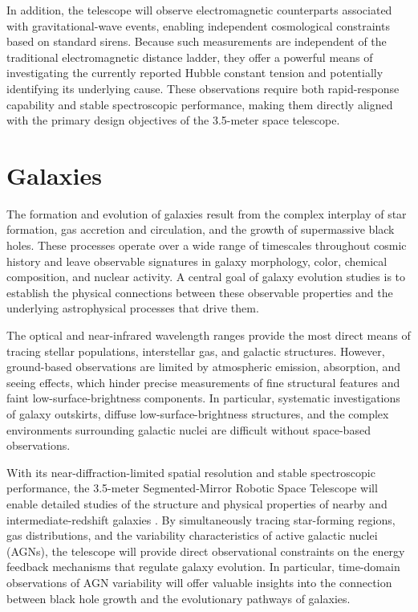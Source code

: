 In addition, the telescope will observe electromagnetic counterparts associated with gravitational-wave events, enabling independent cosmological constraints based on standard sirens. Because such measurements are independent of the traditional electromagnetic distance ladder, they offer a powerful means of investigating the currently reported Hubble constant tension and potentially identifying its underlying cause. These observations require both rapid-response capability and stable spectroscopic performance, making them directly aligned with the primary design objectives of the 3.5-meter space telescope.

\section{Galaxies}

The formation and evolution of galaxies result from the complex interplay of star formation, gas accretion and circulation, and the growth of supermassive black holes. These processes operate over a wide range of timescales throughout cosmic history and leave observable signatures in galaxy morphology, color, chemical composition, and nuclear activity. A central goal of galaxy evolution studies is to establish the physical connections between these observable properties and the underlying astrophysical processes that drive them.

The optical and near-infrared wavelength ranges provide the most direct means of tracing stellar populations, interstellar gas, and galactic structures. However, ground-based observations are limited by atmospheric emission, absorption, and seeing effects, which hinder precise measurements of fine structural features and faint low-surface-brightness components. In particular, systematic investigations of galaxy outskirts, diffuse low-surface-brightness structures, and the complex environments surrounding galactic nuclei are difficult without space-based observations.

With its near-diffraction-limited spatial resolution and stable spectroscopic performance, the 3.5-meter Segmented-Mirror Robotic Space Telescope will enable detailed studies of the structure and physical properties of nearby and intermediate-redshift galaxies \cite{springel2005}. By simultaneously tracing star-forming regions, gas distributions, and the variability characteristics of active galactic nuclei (AGNs), the telescope will provide direct observational constraints on the energy feedback mechanisms that regulate galaxy evolution. In particular, time-domain observations of AGN variability will offer valuable insights into the connection between black hole growth and the evolutionary pathways of galaxies.

